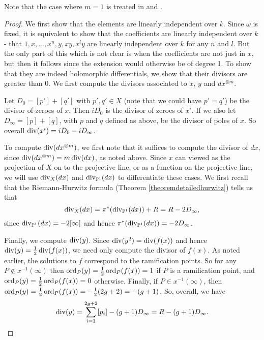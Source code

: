     \begin{rem}
    Note that the case where $m=1$ is treated in \cite[Prop. 7.4.26]{liu} and \cite[Ch. IV, \S 4, Prop. 4.3]{griffiths}.
    \end{rem}
    
    \begin{proof}
    We first show that the elements are linearly independent over $k$.
    Since $\omega$ is fixed, it is equivalent to show that the coefficients are linearly independent over $k$ - \ie that $1,x,\ldots ,x^n, y, xy, x^ly$ are linearly independent over $k$ for any $n$ and $l$.
    But the only part of this which is not clear is when the coefficients are not just in $x$, but then it follows since the extension would otherwise be of degree 1.
    To show that they are indeed holomorphic differentials, we show that their divisors are greater than $0$.
    We first compute the divisors associated to $x$, $y$ and $dx^{\otimes m}$.
    
    Let $D_0 = [p']+[q']$ with $p',q' \in X$ (note that we could have $p' = q'$) be the divisor of zeroes of $x$. 
    Then $ i D_0$ is the divisor of zeroes of $x^i$. 
    If we also let $D_\infty = [p] + [q]$, with $p$ and $q$ defined as above, be the divisor of poles of $x$. 
    So overall $\operatorname{div} (x^i) = i D_0 - i D_\infty$.
    
    
    To compute $\operatorname{div} (dx^{\otimes m})$, we first note that it suffices to compute the divisor of $dx$, since $\operatorname{div} (dx^{\otimes m}) =m\operatorname{div} (dx)$, as noted above.
    Since $x$ can viewed as the projection of $X$ on to the projective line, or as a function on the projective line, we will use $\operatorname{div}_X (dx)$ and $\operatorname{div}_{\mathbb P^1} (dx)$ to differentiate these cases.
    We first recall that the Riemann-Hurwitz formula (Theorem \ref{theoremdetailedhurwitz}) tells us that
        \[
        \operatorname{div}_X (dx) = \pi^*( \operatorname{div}_{\mathbb P^1}(dx)) + R = R - 2D_{\infty},
        \]
    since $\operatorname{div}_{\mathbb P^1}(dx) = -2[\infty]$ and hence $\pi^* (\operatorname{div}_{\mathbb P^1}(dx)) = -2D_\infty$.
    
    Finally, we compute $\operatorname{div} (y)$.
    Since $\operatorname{div} (y^2) = \operatorname{div} (f(x))$ and hence $\operatorname{div}(y) = \frac{1}{2}\operatorname{div}(f(x))$, we need only compute the divisor of $f(x)$.
    As noted earlier, the solutions to $f$ correspond to the ramification points.
    So for any $P\notin x^{-1}(\infty)$ then $\operatorname{ord}_P(y) =  \frac{1}{2}\operatorname{ord}_P(f(x)) = 1$ if $P$ is a ramification point, and $\operatorname{ord}_P(y) = \frac{1}{2}\operatorname{ord}_P(f(x)) = 0$ otherwise.
    Finally, if $P\in x^{-1}(\infty)$, then $\operatorname{ord}_P(y)  = \frac{1}{2}\operatorname{ord}_P(f(x)) = - \frac{1}{2} (2g+2) = -(g+1)$.
    So, overall, we have 
        \[
        \operatorname{div}(y) = \sum_{i=1}^{2g+2} [p_i]- (g+1)D_\infty = R - (g+1)D_{\infty}.
        \]
    

\end{proof}
